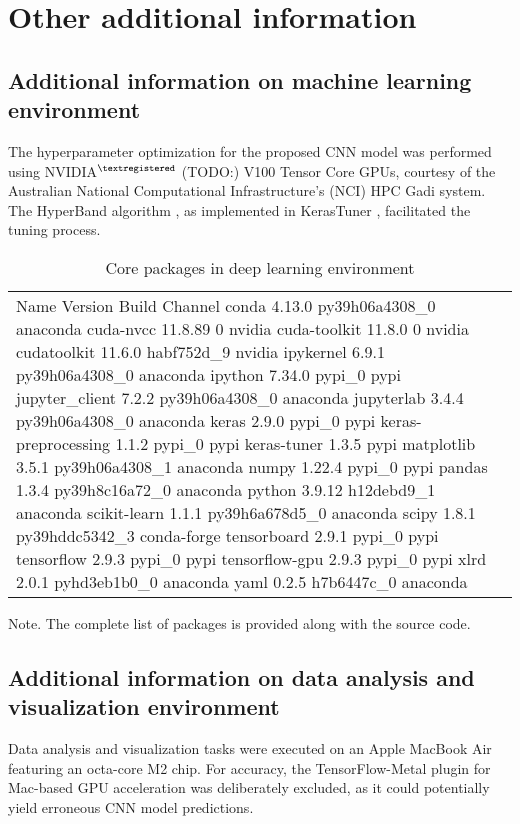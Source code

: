 
\section{Other additional information}

\subsection{Additional information on machine learning environment}

The hyperparameter optimization for the proposed CNN model was performed using NVIDIA$^{\textregistered}$ (TODO:) V100 Tensor Core GPUs, courtesy of the Australian National Computational Infrastructure's (NCI) HPC Gadi system. The HyperBand algorithm \cite{li2018hyperband}, as implemented in KerasTuner \cite{omalley2019kerastuner} , facilitated the tuning process.

\begin{table}[h]
    \centering
    \begin{tabular}{lr}
      \hline
      Name	Version	Build	Channel
      \hline
      conda	4.13.0	py39h06a4308_0	anaconda
      cuda-nvcc	11.8.89	0	nvidia
      cuda-toolkit	11.8.0	0	nvidia
      cudatoolkit	11.6.0	habf752d_9	nvidia
      ipykernel	6.9.1	py39h06a4308_0	anaconda
      ipython	7.34.0	pypi_0	pypi
      jupyter_client	7.2.2	py39h06a4308_0	anaconda
      jupyterlab	3.4.4	py39h06a4308_0	anaconda
      keras	2.9.0	pypi_0	pypi
      keras-preprocessing	1.1.2	pypi_0	pypi
      keras-tuner	1.3.5		pypi
      matplotlib	3.5.1	py39h06a4308_1	anaconda
      numpy	1.22.4	pypi_0	pypi
      pandas	1.3.4	py39h8c16a72_0	anaconda
      python	3.9.12	h12debd9_1	anaconda
      scikit-learn	1.1.1	py39h6a678d5_0	anaconda
      scipy	1.8.1	py39hddc5342_3	conda-forge
      tensorboard	2.9.1	pypi_0	pypi
      tensorflow	2.9.3	pypi_0	pypi
      tensorflow-gpu	2.9.3	pypi_0	pypi
      xlrd	2.0.1	pyhd3eb1b0_0	anaconda
      yaml	0.2.5	h7b6447c_0	anaconda
      \hline
    \end{tabular}
    \caption{Core packages in deep learning environment}
    \label{si_table19}
\end{table}
Note. The complete list of packages is provided along with the source code.



\subsection{Additional information on data analysis and visualization environment}
Data analysis and visualization tasks were executed on an Apple MacBook Air featuring an octa-core M2 chip. For accuracy, the TensorFlow-Metal plugin for Mac-based GPU acceleration was deliberately excluded, as it could potentially yield erroneous CNN model predictions.

